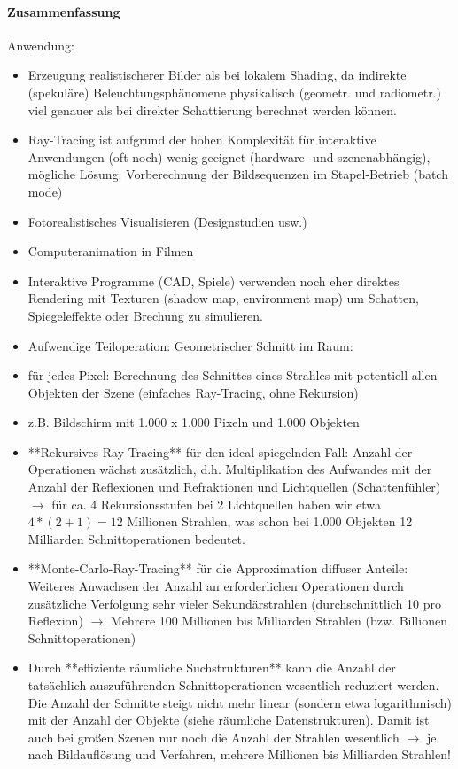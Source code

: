 \documentclass[10pt,landscape]{article}
\begin{document}
\begin{multicols}{3}
{  \paragraph{Zusammenfassung}
  Anwendung:
  \begin{itemize}
    \item Erzeugung realistischerer Bilder als bei lokalem Shading, da indirekte (spekuläre) Beleuchtungsphänomene physikalisch (geometr. und radiometr.) viel genauer als bei direkter Schattierung berechnet werden können.
    \item Ray-Tracing ist aufgrund der hohen Komplexität für interaktive Anwendungen (oft noch) wenig geeignet (hardware- und szenenabhängig), mögliche Lösung: Vorberechnung der Bildsequenzen im Stapel-Betrieb (batch mode)
    \item Fotorealistisches Visualisieren (Designstudien usw.)
    \item Computeranimation in Filmen
    \item Interaktive Programme (CAD, Spiele) verwenden noch eher direktes Rendering mit Texturen (shadow map, environment map) um Schatten, Spiegeleffekte oder Brechung zu simulieren.
    \item Aufwendige Teiloperation: Geometrischer Schnitt im Raum:
    \item für jedes Pixel: Berechnung des Schnittes eines Strahles mit potentiell allen Objekten der Szene (einfaches Ray-Tracing, ohne Rekursion)
    \item z.B. Bildschirm mit 1.000 x 1.000 Pixeln und 1.000 Objekten
    \item **Rekursives Ray-Tracing** für den ideal spiegelnden Fall: Anzahl der Operationen wächst zusätzlich, d.h. Multiplikation des Aufwandes mit der Anzahl der Reflexionen und Refraktionen und Lichtquellen (Schattenfühler) $\rightarrow$ für ca. 4 Rekursionsstufen bei 2 Lichtquellen haben wir etwa $4*(2 + 1) = 12$ Millionen Strahlen, was schon bei 1.000 Objekten 12 Milliarden Schnittoperationen bedeutet.
    \item **Monte-Carlo-Ray-Tracing** für die Approximation diffuser Anteile: Weiteres Anwachsen der Anzahl an erforderlichen Operationen durch zusätzliche Verfolgung sehr vieler Sekundärstrahlen (durchschnittlich 10 pro Reflexion) $\rightarrow$ Mehrere 100 Millionen bis Milliarden Strahlen (bzw. Billionen Schnittoperationen)
    \item Durch **effiziente räumliche Suchstrukturen** kann die Anzahl der tatsächlich auszuführenden Schnittoperationen wesentlich reduziert werden. Die Anzahl der Schnitte steigt nicht mehr linear (sondern etwa logarithmisch) mit der Anzahl der Objekte (siehe räumliche Datenstrukturen). Damit ist auch bei großen Szenen nur noch die Anzahl der Strahlen wesentlich $\rightarrow$ je nach Bildauflösung und Verfahren, mehrere Millionen bis Milliarden Strahlen!

\end{itemize}}
\end{multicols}
\end{document}
